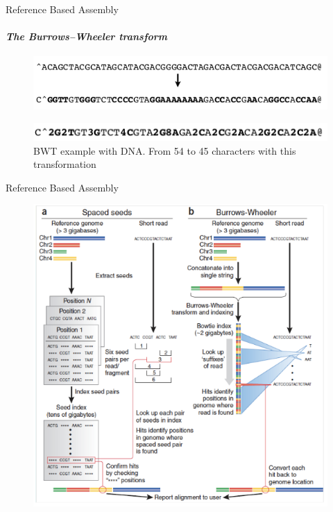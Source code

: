 \documentclass{if-beamer}
\begin{document}
\begin{frame}{Reference Based Assembly}
\framesubtitle{\emph{The Burrows–Wheeler transform}}
\begin{figure}
\centering
\includegraphics[scale=0.6]{example_bwt_sequence1.PNG}
\end{figure}
\begin{figure}
\centering
\includegraphics[scale=0.6]{example_bwt_sequence2.PNG}
\caption{BWT example with DNA. From 54 to 45 characters with this transformation}
\end{figure}
\end{frame}
\begin{frame}{Reference Based Assembly}
\begin{figure}
\centering
\includegraphics[scale=0.5]{bwt.PNG}
\end{figure}
\end{frame}
\end{document}
